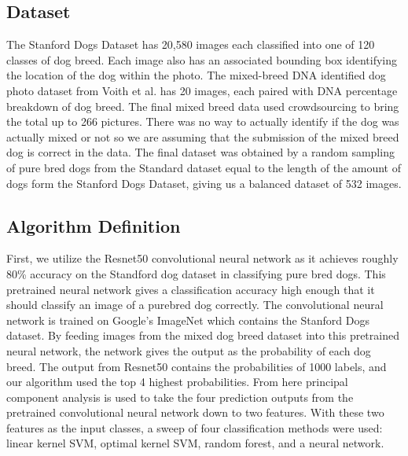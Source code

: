 \documentclass[12pt]{article}
\begin{document}
\subsection{Dataset}

The Stanford Dogs Dataset has 20,580 images each classified into one of 120 classes of dog breed. \cite{khosla2011novel} Each image also has an associated bounding box identifying the location of the dog within the photo. The mixed-breed DNA identified dog photo dataset from Voith et al. \cite{voith2009comparison} has 20 images, each paired with DNA percentage breakdown of dog breed. The final mixed breed data used crowdsourcing to bring the total up to 266 pictures. There was no way to actually identify if the dog was actually mixed or not so we are assuming that the submission of the mixed breed dog is correct in the data. The final dataset was obtained by a random sampling of pure bred dogs from the Standard dataset equal to the length of the amount of dogs form the Stanford Dogs Dataset, giving us a balanced dataset of 532 images. 

\subsection{Algorithm Definition}

First, we utilize the Resnet50 convolutional neural network \cite{he2015deep} as it achieves roughly 80\% accuracy on the Standford dog dataset in classifying pure bred dogs. This pretrained neural network gives a classification accuracy high enough that it should classify an image of a purebred dog correctly. The convolutional neural network is trained on Google's ImageNet which contains the Stanford Dogs dataset. By feeding images from the mixed dog breed dataset into this pretrained neural network, the network gives the output as the probability of each dog breed. The output from Resnet50 contains the probabilities of 1000 labels, and our algorithm used the top 4 highest probabilities. From here principal component analysis is used to take the four prediction outputs from the pretrained convolutional neural network down to two features. With these two features as the input classes, a sweep of four classification methods were used: linear kernel SVM, optimal kernel SVM, random forest, and a neural network.
\end{document}
